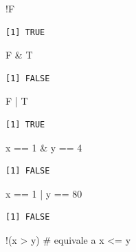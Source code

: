 \documentclass[
  letterpaper,
  DIV=11,
  numbers=noendperiod]{scrartcl}
\newenvironment{Shaded}{\begin{snugshade}}{\end{snugshade}}
\newcommand{\CommentTok}[1]{\textcolor[rgb]{0.37,0.37,0.37}{#1}}
\newcommand{\DecValTok}[1]{\textcolor[rgb]{0.68,0.00,0.00}{#1}}
\newcommand{\NormalTok}[1]{\textcolor[rgb]{0.00,0.23,0.31}{#1}}
\newcommand{\SpecialCharTok}[1]{\textcolor[rgb]{0.37,0.37,0.37}{#1}}
\begin{document}
\begin{Shaded}
\begin{Highlighting}[]
\SpecialCharTok{!}\NormalTok{F }
\end{Highlighting}
\end{Shaded}

\begin{verbatim}
[1] TRUE
\end{verbatim}

\begin{Shaded}
\begin{Highlighting}[]
\NormalTok{F }\SpecialCharTok{\&}\NormalTok{ T }
\end{Highlighting}
\end{Shaded}

\begin{verbatim}
[1] FALSE
\end{verbatim}

\begin{Shaded}
\begin{Highlighting}[]
\NormalTok{F }\SpecialCharTok{|}\NormalTok{ T }
\end{Highlighting}
\end{Shaded}

\begin{verbatim}
[1] TRUE
\end{verbatim}

\begin{Shaded}
\begin{Highlighting}[]
\NormalTok{x }\SpecialCharTok{==} \DecValTok{1} \SpecialCharTok{\&}\NormalTok{ y }\SpecialCharTok{==} \DecValTok{4}
\end{Highlighting}
\end{Shaded}

\begin{verbatim}
[1] FALSE
\end{verbatim}

\begin{Shaded}
\begin{Highlighting}[]
\NormalTok{x }\SpecialCharTok{==} \DecValTok{1} \SpecialCharTok{|}\NormalTok{ y }\SpecialCharTok{==} \DecValTok{80} 
\end{Highlighting}
\end{Shaded}

\begin{verbatim}
[1] FALSE
\end{verbatim}

\begin{Shaded}
\begin{Highlighting}[]
\SpecialCharTok{!}\NormalTok{(x }\SpecialCharTok{\textgreater{}}\NormalTok{ y) }\CommentTok{\# equivale a x \textless{}= y}
\end{Highlighting}
\end{Shaded}
\end{document}
